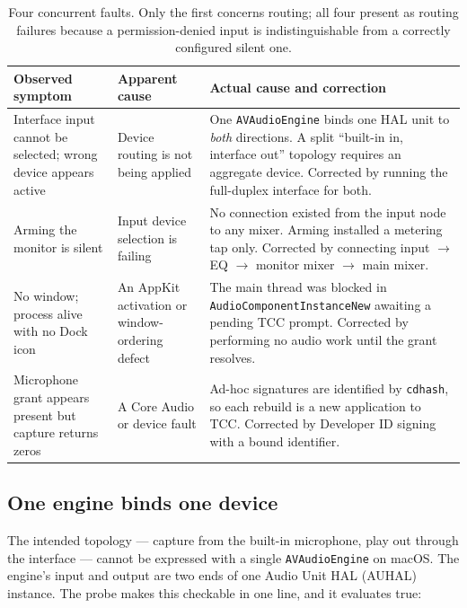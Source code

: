 \documentclass[10pt,letterpaper,twocolumn]{article}
\newcommand{\code}[1]{\texttt{#1}}
\begin{document}
\begin{table}[t]
\centering
\small
\begin{tabularx}{\textwidth}{@{}p{3.5cm}p{3.6cm}X@{}}
\toprule
\textbf{Observed symptom} & \textbf{Apparent cause} & \textbf{Actual cause and correction} \\
\midrule
Interface input cannot be selected; wrong device appears active &
Device routing is not being applied &
One \code{AVAudioEngine} binds one HAL unit to \emph{both} directions. A split ``built-in in, interface out'' topology requires an aggregate device. Corrected by running the full-duplex interface for both. \\
\addlinespace
Arming the monitor is silent &
Input device selection is failing &
No connection existed from the input node to any mixer. Arming installed a metering tap only. Corrected by connecting input $\rightarrow$ EQ $\rightarrow$ monitor mixer $\rightarrow$ main mixer. \\
\addlinespace
No window; process alive with no Dock icon &
An AppKit activation or window-ordering defect &
The main thread was blocked in \code{AudioComponent\allowbreak Instance\allowbreak New} awaiting a pending TCC prompt. Corrected by performing no audio work until the grant resolves. \\
\addlinespace
Microphone grant appears present but capture returns zeros &
A Core Audio or device fault &
Ad-hoc signatures are identified by \code{cdhash}, so each rebuild is a new application to TCC. Corrected by Developer ID signing with a bound identifier. \\
\bottomrule
\end{tabularx}
\caption{Four concurrent faults. Only the first concerns routing; all four present as routing failures because a permission-denied input is indistinguishable from a correctly configured silent one.}
\label{tab:modes}
\end{table}

\subsection{One engine binds one device}

The intended topology --- capture from the built-in microphone, play out through the interface --- cannot be expressed with a single \code{AVAudioEngine} on macOS. The engine's input and output are two ends of one Audio Unit HAL (AUHAL) instance. The probe makes this checkable in one line, and it evaluates true:
\end{document}
